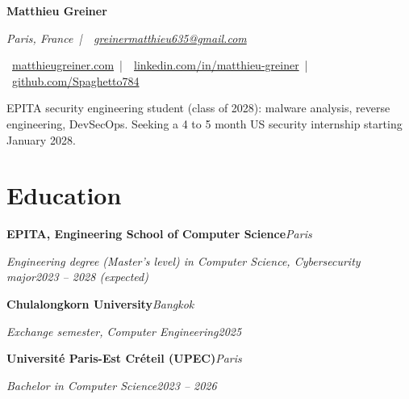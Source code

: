 \documentclass[10pt]{article}
\newcommand{\school}[4]{\textbf{#1}\hfill\textit{#2}\par\textit{#3}\hfill\textit{#4}\par}
\newcommand{\gap}{\vspace{4pt}}
\begin{document}
\fontsize{10.4}{12.4}\selectfont

{\LARGE\bfseries Matthieu Greiner}\par\vspace{2pt}
{\small\itshape
\faMapMarker* Paris, France \,|\,
\faEnvelope \ \href{mailto:greinermatthieu635@gmail.com}{greinermatthieu635@gmail.com}\par
\faGlobe \ \href{https://matthieugreiner.com}{matthieugreiner.com} \,|\,
\faLinkedin \ \href{https://www.linkedin.com/in/matthieu-greiner}{linkedin.com/in/matthieu-greiner} \,|\,
\faGithub \ \href{https://github.com/Spaghetto784}{github.com/Spaghetto784}\par}
\vspace{5pt}
{\small EPITA security engineering student (class of 2028): malware analysis, reverse engineering, DevSecOps.
Seeking a 4 to 5 month US security internship starting January 2028.\par}

\section{Education}
\school{EPITA, Engineering School of Computer Science}{Paris}{Engineering degree (Master's level) in Computer Science, Cybersecurity major}{2023 -- 2028 (expected)}\gap
\school{Chulalongkorn University}{Bangkok}{Exchange semester, Computer Engineering}{2025}\gap
\school{Universit\'e Paris-Est Cr\'eteil (UPEC)}{Paris}{Bachelor in Computer Science}{2023 -- 2026}
\end{document}
